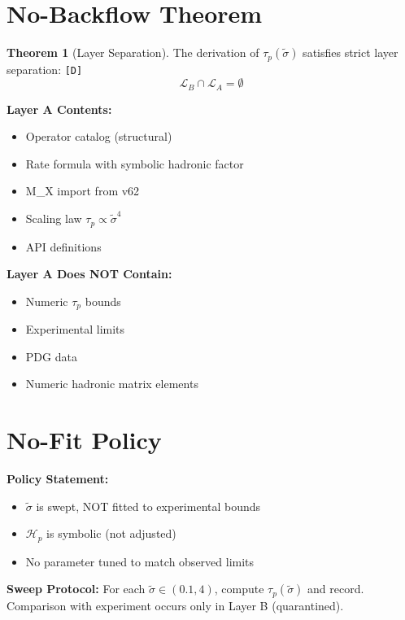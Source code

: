 \documentclass[11pt,a4paper]{article}
\newcommand{\tagD}{\textcolor{green!50!black}{\texttt{[D]}}}
\theoremstyle{definition}
\newtheorem{theorem}{Theorem}[section]
\begin{document}
\section{No-Backflow Theorem}
\label{sec:no-backflow}

\begin{nobackflowbox}
\begin{theorem}[Layer Separation]
\label{thm:no-backflow}
The derivation of $\tau_p(\tilde{\sigma})$ satisfies strict layer separation: \tagD{}
\begin{equation}
\label{eq:no-backflow}
\boxed{\mathcal{L}_B \cap \mathcal{L}_A = \emptyset}
\end{equation}

\textbf{Layer A Contents:}
\begin{itemize}
  \item Operator catalog (structural)
  \item Rate formula with symbolic hadronic factor
  \item M\_X import from v62
  \item Scaling law $\tau_p \propto \tilde{\sigma}^4$
  \item API definitions
\end{itemize}

\textbf{Layer A Does NOT Contain:}
\begin{itemize}
  \item[$\times$] Numeric $\tau_p$ bounds
  \item[$\times$] Experimental limits
  \item[$\times$] PDG data
  \item[$\times$] Numeric hadronic matrix elements
\end{itemize}
\end{theorem}
\end{nobackflowbox}

\section{No-Fit Policy}
\label{sec:no-fit}

\begin{nofitbox}
\textbf{Policy Statement:}
\begin{itemize}
  \item $\tilde{\sigma}$ is swept, NOT fitted to experimental bounds
  \item $\mathcal{H}_p$ is symbolic (not adjusted)
  \item No parameter tuned to match observed limits
\end{itemize}

\textbf{Sweep Protocol:}
For each $\tilde{\sigma} \in (0.1, 4)$, compute $\tau_p(\tilde{\sigma})$ and record.
Comparison with experiment occurs only in Layer B (quarantined).
\end{nofitbox}
\end{document}
